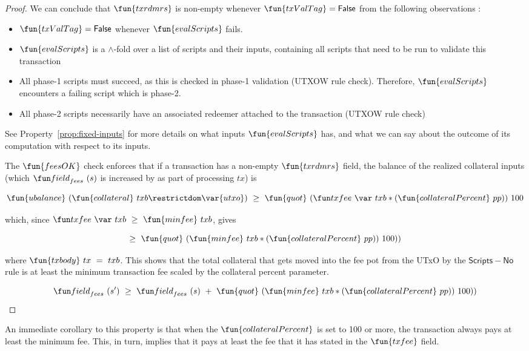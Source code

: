 \begin{property}
\begin{proof}
  We can conclude that $\fun{txrdmrs}$ is non-empty whenever $\fun{txValTag} = \False$
  from the following observations :
  \begin{itemize}
    \item $\fun{txValTag} = \False$ whenever $\fun{evalScripts}$ fails.
    \item $\fun{evalScripts}$ is a $\wedge$-fold over a list of scripts and
    their inputs, containing all scripts that need to be run to validate this transaction
    \item All phase-1 scripts must succeed, as this is checked in phase-1 validation (UTXOW
    rule check). Therefore,
    $\fun{evalScripts}$ encounters a failing script which is phase-2.
    \item All phase-2 scripts necessarily have an associated redeemer attached to the
    transaction (UTXOW rule check)
  \end{itemize}

  See Property~\ref{prop:fixed-inputs} for more details on what inputs $\fun{evalScripts}$ has,
  and what we can say about the outcome of its computation with respect to its inputs.

  The $\fun{feesOK}$ check enforces that if a transaction has a non-empty
  $\fun{txrdmrs}$ field, the balance of the realized collateral inputs
  (which $\field_{fees}~(s)$ is increased by as part of processing $tx$) is

  \[\fun{ubalance}~(\fun{collateral}~{txb} \restrictdom \var{utxo})~\geq~\fun{quot}~(\txfee~{txb} * (\fun{collateralPercent}~pp))~100\]

  which, since $\txfee~{txb}~\geq~\fun{minfee}~{txb}$, gives

  \[ \geq~\fun{quot}~(\fun{minfee}~{txb} * (\fun{collateralPercent}~pp))~100)) \]

  where $\fun{txbody}~{tx}~=~{txb}$. This shows that the total collateral that gets
  moved into the fee pot from the UTxO by the $\mathsf{Scripts{-}No}$ rule is at
  least the minimum transaction fee scaled by the collateral percent parameter.

  \[\field_{fees}~(s')~\geq~\field_{fees}~(s)~+~\fun{quot}~(\fun{minfee}~{txb} * (\fun{collateralPercent}~pp))~100))\]
\end{proof}

An immediate corollary to this property is that when the $\fun{collateralPercent}$ is set to 100 or more,
the transaction always pays at least the minimum fee. This, in turn, implies that it
pays at least the fee that it has stated in the $\fun{txfee}$ field.


\end{property}
